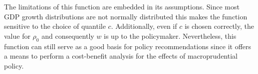 The limitations of this function are embedded in its assumptions. Since most GDP growth distributions are not normally distributed this makes the function sensitive to the choice of quantile $c$. Additionally, even if $c$ is chosen correctly, the value for $\rho_0$ and consequently $w$ is up to the policymaker. Nevertheless, this function can still serve as a good basis for policy recommendations since it offers a means to perform a cost-benefit analysis for the effects of macroprudential policy.